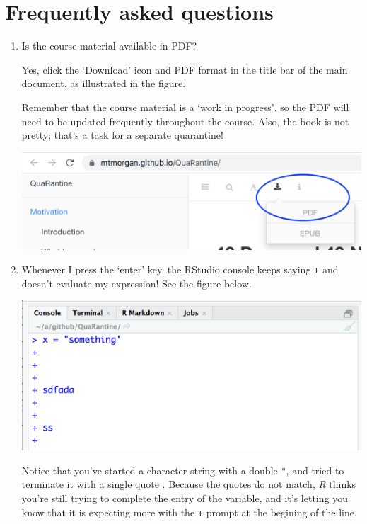 \documentclass[]{book}
\begin{document}
\hypertarget{frequently-asked-questions}{%
\chapter*{Frequently asked questions}\label{frequently-asked-questions}}

\begin{enumerate}
\def\labelenumi{\arabic{enumi}.}
\item
  Is the course material available in PDF?

  Yes, click the `Download' icon and PDF format in the title bar of the main document, as illustrated in the figure.

  Remember that the course material is a `work in progress', so the PDF will need to be updated frequently throughout the course. Also, the book is not pretty; that's a task for a separate quarantine!

  \includegraphics[width=16.97in]{images/99-Download-PDF}
\item
  Whenever I press the `enter' key, the RStudio console keeps saying \texttt{+} and doesn't evaluate my expression! See the figure below.

  \includegraphics[width=15.81in]{images/99-console-plus-1}

  Notice that you've started a character string with a double \texttt{"}, and tried to terminate it with a single quote \texttt{\textquotesingle{}}. Because the quotes do not match, \emph{R} thinks you're still trying to complete the entry of the variable, and it's letting you know that it is expecting more with the \texttt{+} prompt at the begining of the line.


\end{enumerate}
\end{document}
